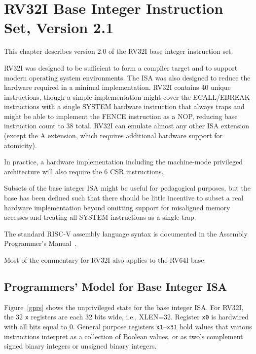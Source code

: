 \chapter{RV32I Base Integer Instruction Set, Version 2.1}
\label{rv32}

This chapter describes version 2.0 of the RV32I base integer
instruction set.

\begin{commentary}
RV32I was designed to be sufficient to form a compiler target and to
support modern operating system environments.  The ISA was also
designed to reduce the hardware required in a minimal implementation.
RV32I contains 40 unique instructions, though a simple implementation
might cover the ECALL/EBREAK instructions with a single SYSTEM
hardware instruction that always traps and might be able to implement
the FENCE instruction as a NOP, reducing base instruction count to 38
total.  RV32I can emulate almost any other ISA extension (except the A
extension, which requires additional hardware support for atomicity).

In practice, a hardware implementation including the machine-mode
privileged architecture will also require the 6 CSR instructions.

Subsets of the base integer ISA might be useful for pedagogical
purposes, but the base has been defined such that there should be
little incentive to subset a real hardware implementation beyond
omitting support for misaligned memory accesses and treating all
SYSTEM instructions as a single trap.
\end{commentary}

\begin{commentary}
The standard RISC-V assembly language syntax is documented in the
Assembly Programmer's Manual~\cite{riscv-asm-manual}.
\end{commentary}

\begin{commentary}
Most of the commentary for RV32I also applies to the RV64I base.
\end{commentary}

\section{Programmers' Model for Base Integer ISA}

Figure~\ref{gprs} shows the unprivileged state for the base integer
ISA.  For RV32I, the 32 {\tt x} registers are each 32 bits wide, i.e.,
XLEN=32.  Register {\tt x0} is hardwired with all bits equal to 0.
General purpose registers {\tt x1}--{\tt x31} hold values that various
instructions interpret as a collection of Boolean values, or as two's
complement signed binary integers or unsigned binary integers.

